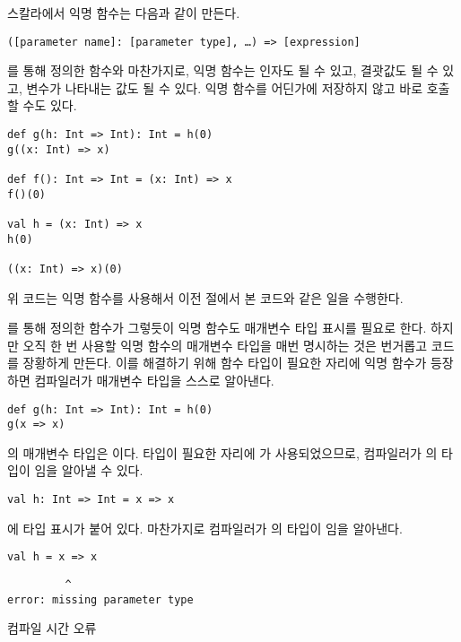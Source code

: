 스칼라에서 익명 함수는 다음과 같이 만든다.

\begin{verbatim}
([parameter name]: [parameter type], …) => [expression]
\end{verbatim}

를 통해 정의한 함수와 마찬가지로, 익명 함수는 인자도 될 수 있고,
결괏값도 될 수 있고, 변수가 나타내는 값도 될 수 있다. 익명 함수를 어딘가에
저장하지 않고 바로 호출할 수도 있다.

\begin{verbatim}
def g(h: Int => Int): Int = h(0)
g((x: Int) => x)

def f(): Int => Int = (x: Int) => x
f()(0)

val h = (x: Int) => x
h(0)

((x: Int) => x)(0)
\end{verbatim}

위 코드는 익명 함수를 사용해서 이전 절에서 본 코드와 같은 일을 수행한다.

를 통해 정의한 함수가 그렇듯이 익명 함수도 매개변수 타입 표시를 필요로 한다.
하지만 오직 한 번 사용할 익명 함수의 매개변수 타입을 매번 명시하는 것은 번거롭고
코드를 장황하게 만든다. 이를 해결하기 위해 함수 타입이 필요한 자리에 익명 함수가
등장하면 컴파일러가 매개변수 타입을 스스로 알아낸다.

\begin{verbatim}
def g(h: Int => Int): Int = h(0)
g(x => x)
\end{verbatim}

의 매개변수 타입은 이다.  타입이
필요한 자리에 가 사용되었으므로, 컴파일러가 의 타입이
임을 알아낼 수 있다.

\begin{verbatim}
val h: Int => Int = x => x
\end{verbatim}

에 타입 표시가 붙어 있다. 마찬가지로 컴파일러가 의 타입이
임을 알아낸다.

\begin{verbatim}
val h = x => x
\end{verbatim}
\vspace{-1em}
\begin{mdframed}[hidealllines=true,backgroundcolor=gray!10,innerleftmargin=3pt,innerrightmargin=3pt,leftmargin=-3pt,rightmargin=-3pt]
\begin{verbatim}
         ^
error: missing parameter type
\end{verbatim}
\vspace{-2em}
\begin{flushright}
\scriptsize\textsf{컴파일 시간 오류}
\end{flushright}
\end{mdframed}

